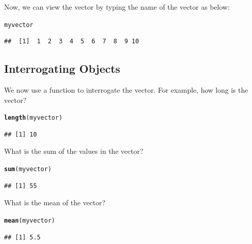 \documentclass{tufte-handout}\usepackage[]{graphicx}\usepackage[]{xcolor}
\makeatletter
\newcommand{\hlstd}[1]{\textcolor[rgb]{0.345,0.345,0.345}{#1}}%
\newcommand{\hlkwd}[1]{\textcolor[rgb]{0.737,0.353,0.396}{\textbf{#1}}}%
\newenvironment{kframe}{%
 \def\at@end@of@kframe{}%
 \ifinner\ifhmode%
  \def\at@end@of@kframe{\end{minipage}}%
  \begin{minipage}{\columnwidth}%
 \fi\fi%
 \def\FrameCommand##1{\hskip\@totalleftmargin \hskip-\fboxsep
 \colorbox{shadecolor}{##1}\hskip-\fboxsep
     \hskip-\linewidth \hskip-\@totalleftmargin \hskip\columnwidth}%
 \MakeFramed {\advance\hsize-\width
   \@totalleftmargin\z@ \linewidth\hsize
   \@setminipage}}%
 {\par\unskip\endMakeFramed%
 \at@end@of@kframe}
\newenvironment{knitrout}{}{} %
\makeatother
\begin{document}
Now, we can view the vector by typing the name of the vector as below:  

\begin{knitrout}
\color{fgcolor}\begin{kframe}
\begin{alltt}
\hlstd{myvector}
\end{alltt}
\begin{verbatim}
##  [1]  1  2  3  4  5  6  7  8  9 10
\end{verbatim}
\end{kframe}
\end{knitrout}

\subsection{Interrogating Objects}

We now use a function to interrogate the vector. For example, how long is the vector?

\begin{knitrout}
\color{fgcolor}\begin{kframe}
\begin{alltt}
\hlkwd{length}\hlstd{(myvector)}
\end{alltt}
\begin{verbatim}
## [1] 10
\end{verbatim}
\end{kframe}
\end{knitrout}

What is the sum of the values in the vector?

\begin{knitrout}
\color{fgcolor}\begin{kframe}
\begin{alltt}
\hlkwd{sum}\hlstd{(myvector)}
\end{alltt}
\begin{verbatim}
## [1] 55
\end{verbatim}
\end{kframe}
\end{knitrout}

What is the mean of the vector?

\begin{knitrout}
\color{fgcolor}\begin{kframe}
\begin{alltt}
\hlkwd{mean}\hlstd{(myvector)}
\end{alltt}
\begin{verbatim}
## [1] 5.5
\end{verbatim}
\end{kframe}
\end{knitrout}
\end{document}
